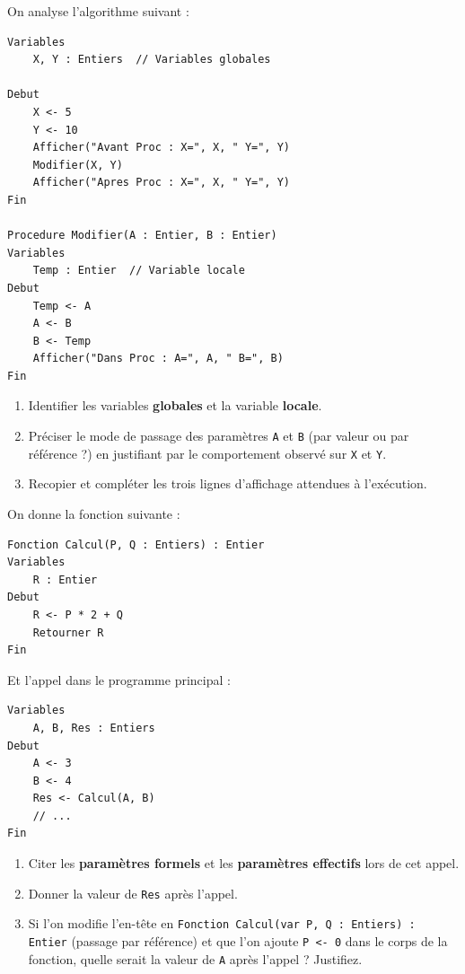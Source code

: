 \documentclass[11pt]{article}
\begin{document}
\begin{exercice}
On analyse l'algorithme suivant :
\begin{verbatim}
Variables
    X, Y : Entiers  // Variables globales

Debut
    X <- 5
    Y <- 10
    Afficher("Avant Proc : X=", X, " Y=", Y)
    Modifier(X, Y)
    Afficher("Apres Proc : X=", X, " Y=", Y)
Fin

Procedure Modifier(A : Entier, B : Entier)
Variables
    Temp : Entier  // Variable locale
Debut
    Temp <- A
    A <- B
    B <- Temp
    Afficher("Dans Proc : A=", A, " B=", B)
Fin
\end{verbatim}
\begin{enumerate}
    \item Identifier les variables \textbf{globales} et la variable \textbf{locale}.
    \item Préciser le mode de passage des paramètres \texttt{A} et \texttt{B} (par valeur ou par référence ?) en justifiant par le comportement observé sur \texttt{X} et \texttt{Y}.
    \item Recopier et compléter les trois lignes d'affichage attendues à l'exécution.
\end{enumerate}
\end{exercice}

\begin{exercice}
On donne la fonction suivante :
\begin{verbatim}
Fonction Calcul(P, Q : Entiers) : Entier
Variables
    R : Entier
Debut
    R <- P * 2 + Q
    Retourner R
Fin
\end{verbatim}
Et l'appel dans le programme principal :
\begin{verbatim}
Variables
    A, B, Res : Entiers
Debut
    A <- 3
    B <- 4
    Res <- Calcul(A, B)
    // ...
Fin
\end{verbatim}
\begin{enumerate}
    \item Citer les \textbf{paramètres formels} et les \textbf{paramètres effectifs} lors de cet appel.
    \item Donner la valeur de \texttt{Res} après l'appel.
    \item Si l'on modifie l'en-tête en \texttt{Fonction Calcul(var P, Q : Entiers) : Entier} (passage par référence) et que l'on ajoute \texttt{P <- 0} dans le corps de la fonction, quelle serait la valeur de \texttt{A} après l'appel ? Justifiez.
\end{enumerate}
\end{exercice}
\end{document}
